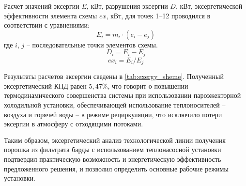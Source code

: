 Расчет значений эксергии $E$, ${ кВт}$, разрушения эксергии $D$, ${ кВт}$, эксергетической эффективности элемента схемы $ex$, ${ кВт}$, для точек 1--12 %
проводился в соответствии с уравнениями:
\begin{equation} \label{GrindEQequation54} 
E_i{ =}m_i\cdot \left(e_i{ -}e_j\right) 
\end{equation} 
где $i$, $j$ -- последовательные точки элементов схемы.
\begin{equation} \label{GrindEQequation56} 
D_i{ =}E_i{ -}E_j 
\end{equation} 
\begin{equation} \label{GrindEQequation57} 
ex_{{ i}}{ =}E_i{ /}E_j 
\end{equation} 


Результаты расчетов эксергии сведены в \cref{tab:exergy_sheme}.
Полученный эксергетический КПД равен \(5,47\)\%, что говорит о повышении термодинамического совершенства системы при использовании пароэжекторной холодильной установки, обеспечивающей использование теплоносителей -- воздуха и горячей воды -- в режиме рециркуляции, что исключило потери эксергии в атмосферу с отходящими потоками. 


Таким образом, эксергетический анализ технологической линии получения порошка из фильтрата барды с использованием теплонасосной установки подтвердил практическую возможность и энергетическую эффективность предложенного решения, и позволил определить основные рабочие режимы установки.
